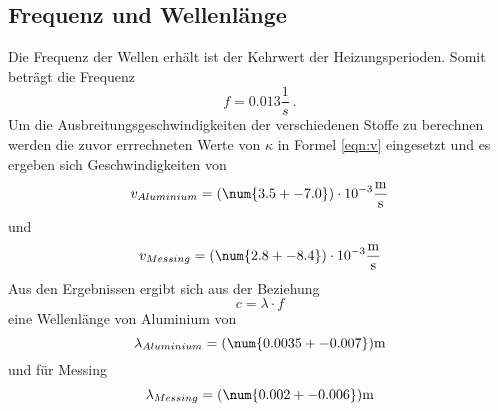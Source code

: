 \subsection{Frequenz und Wellenlänge}
Die Frequenz der Wellen erhält ist der Kehrwert der Heizungsperioden. Somit beträgt die Frequenz 
\begin{equation}
	f = 0.013 \frac{1}{s} \ .  
\end{equation}
Um die Ausbreitungsgeschwindigkeiten der verschiedenen Stoffe zu berechnen werden die zuvor errrechneten Werte von $\kappa$ in Formel \ref{eqn:v} eingesetzt und es ergeben sich Geschwindigkeiten von 
\begin{equation}
	v_{Aluminium} =(\num{3.5 +- 7.0}) \cdot 10^{-3} \frac{\text{m}}{\text{s}}
\end{equation} 
und 
\begin{equation}
	v_{Messing} = (\num{2.8 +- 8.4}) \cdot 10^{-3} \frac{\text{m}}{\text{s}} 
\end{equation}
Aus den Ergebnissen ergibt sich aus der Beziehung 
\begin{equation}
	c = \lambda \cdot f
\end{equation} 
eine Wellenlänge von Aluminium von
\begin{equation}
        \lambda_{Aluminium} = (\num{0.0035 +- 0.007}) \text{m}
\end{equation}
und für Messing 
\begin{equation}
	\lambda_{Messing} = (\num{0.002 +- 0.006}) \text{m}
\end{equation}
